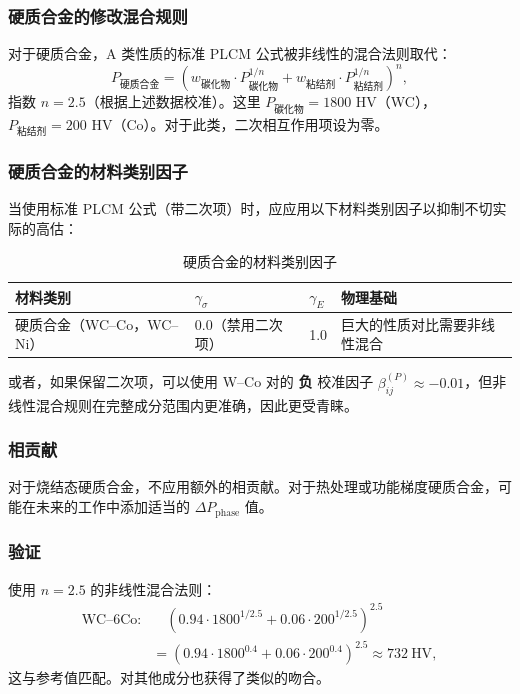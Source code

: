 \documentclass[12pt,a4paper]{article}
\begin{document}
	\subsubsection{硬质合金的修改混合规则}
	对于硬质合金，A 类性质的标准 PLCM 公式被非线性的混合法则取代：
	\[
	P_{\text{硬质合金}} = \left( w_{\text{碳化物}} \cdot P_{\text{碳化物}}^{1/n} + w_{\text{粘结剂}} \cdot P_{\text{粘结剂}}^{1/n} \right)^{n},
	\]
	指数 $n = 2.5$（根据上述数据校准）。这里 $P_{\text{碳化物}} = 1800$ HV（WC），$P_{\text{粘结剂}} = 200$ HV（Co）。对于此类，二次相互作用项设为零。
	
	\subsubsection{硬质合金的材料类别因子}
	当使用标准 PLCM 公式（带二次项）时，应应用以下材料类别因子以抑制不切实际的高估：
	
	\begin{longtable}{p{3.5cm} p{2.5cm} p{2.5cm} p{5cm}}
		\caption{硬质合金的材料类别因子}\\
		\toprule
		\textbf{材料类别} & $\gamma_{\sigma}$ & $\gamma_{E}$ & \textbf{物理基础} \\
		\midrule
		硬质合金（WC–Co，WC–Ni） & 0.0（禁用二次项） & 1.0 & 巨大的性质对比需要非线性混合 \\
		\bottomrule
	\end{longtable}
	
	或者，如果保留二次项，可以使用 W–Co 对的 \textbf{负} 校准因子 $\beta_{ij}^{(P)} \approx -0.01$，但非线性混合规则在完整成分范围内更准确，因此更受青睐。
	
	\subsubsection{相贡献}
	对于烧结态硬质合金，不应用额外的相贡献。对于热处理或功能梯度硬质合金，可能在未来的工作中添加适当的 $\Delta P_{\text{phase}}$ 值。
	
	\subsubsection{验证}
	使用 $n=2.5$ 的非线性混合法则：
	\[
	\begin{aligned}
		\text{WC–6Co:}&\quad (0.94\cdot1800^{1/2.5} + 0.06\cdot200^{1/2.5})^{2.5} \\
		&= (0.94\cdot1800^{0.4} + 0.06\cdot200^{0.4})^{2.5} \approx 732\ \text{HV},
	\end{aligned}
	\]
	这与参考值匹配。对其他成分也获得了类似的吻合。
	
\end{document}
